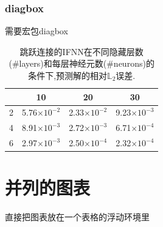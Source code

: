 \documentclass[UTF8,a4paper,8pt,no-math]{article} %
\numberwithin{equation}{section} %
\begin{document}
\subsubsection{diagbox}
需要宏包diagbox
\begin{table}
	\centering
	\begin{tabular}{cccc}
		\toprule
		\diagbox{\#layers}{\#neurons} & 10                  & 20                  & 30                  \\
		\midrule
		2                             & 5.76$\times10^{-2}$ & 2.33$\times10^{-2}$ & 9.23$\times10^{-3}$ \\
		4                             & 8.91$\times10^{-3}$ & 2.72$\times10^{-3}$ & 6.71$\times10^{-4}$ \\
		6                             & 2.97$\times10^{-3}$ & 2.50$\times10^{-4}$ & 2.32$\times10^{-4}$ \\
		\bottomrule
	\end{tabular}
	\caption{跳跃连接的{\rm IFNN}在不同隐藏层数{\rm (\#layers)}和每层神经元数{\rm (\#neurons)}的条件下,预测解的相对$\mathbb{L}_2$误差.}
\end{table}

\section{并列的图表}
直接把图表放在一个表格的浮动环境里
\end{document}
